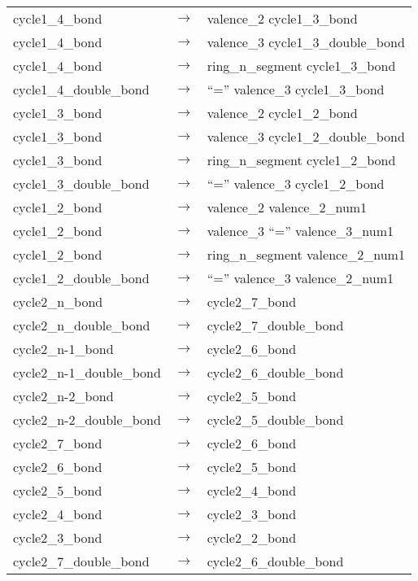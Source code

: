 \documentclass[../Document.tex]{subfiles}
\begin{document}
\begin{longtable}{m{} p{} p{}}
    cycle1\_4\_bond & $\rightarrow$ & valence\_2 cycle1\_3\_bond \\
    cycle1\_4\_bond & $\rightarrow$ & valence\_3 cycle1\_3\_double\_bond \\
    cycle1\_4\_bond & $\rightarrow$ & ring\_n\_segment cycle1\_3\_bond \\
    cycle1\_4\_double\_bond & $\rightarrow$ & ``='' valence\_3 cycle1\_3\_bond \\
    cycle1\_3\_bond & $\rightarrow$ & valence\_2 cycle1\_2\_bond \\
    cycle1\_3\_bond & $\rightarrow$ & valence\_3 cycle1\_2\_double\_bond \\
    cycle1\_3\_bond & $\rightarrow$ & ring\_n\_segment cycle1\_2\_bond \\
    cycle1\_3\_double\_bond & $\rightarrow$ & ``='' valence\_3 cycle1\_2\_bond \\
    cycle1\_2\_bond & $\rightarrow$ & valence\_2 valence\_2\_num1 \\
    cycle1\_2\_bond & $\rightarrow$ & valence\_3 ``='' valence\_3\_num1 \\
    cycle1\_2\_bond & $\rightarrow$ & ring\_n\_segment valence\_2\_num1 \\
    cycle1\_2\_double\_bond & $\rightarrow$ & ``='' valence\_3 valence\_2\_num1 \\
    cycle2\_n\_bond & $\rightarrow$ & cycle2\_7\_bond \\
    cycle2\_n\_double\_bond & $\rightarrow$ & cycle2\_7\_double\_bond \\
    cycle2\_n-1\_bond & $\rightarrow$ & cycle2\_6\_bond \\
    cycle2\_n-1\_double\_bond & $\rightarrow$ & cycle2\_6\_double\_bond \\
    cycle2\_n-2\_bond & $\rightarrow$ & cycle2\_5\_bond \\
    cycle2\_n-2\_double\_bond & $\rightarrow$ & cycle2\_5\_double\_bond \\
    cycle2\_7\_bond & $\rightarrow$ & cycle2\_6\_bond \\
    cycle2\_6\_bond & $\rightarrow$ & cycle2\_5\_bond \\
    cycle2\_5\_bond & $\rightarrow$ & cycle2\_4\_bond \\
    cycle2\_4\_bond & $\rightarrow$ & cycle2\_3\_bond \\
    cycle2\_3\_bond & $\rightarrow$ & cycle2\_2\_bond \\
    cycle2\_7\_double\_bond & $\rightarrow$ & cycle2\_6\_double\_bond \\

\end{longtable}
\end{document}
